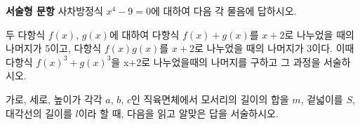 \documentclass[11pt]{exam}
\begin{document}
\begin{questions}
\newpage

\textbf{서술형 문항}
\addpoints
\question[6] 사차방정식 $x^4-9=0$에 대하여 다음 각 물음에 답하시오.
\noaddpoints %

\addpoints
\question[8] 두 다항식 $f(x)$, $g(x)$에 대하여 다항식 $f(x) + g(x)$를 $x+2$로 나누었을 때의 나머지가 5이고, 다항식 $f(x)g(x)$를 $x+2$로 나누었을 때의 나머지가 3이다. 이때 다항식 ${f(x)}^3+{g(x)}^3$을 x+2로 나누었을때의 나머지를 구하고 그 과정을 서술하시오.
\vspace{4.0in}

\addpoints
\question[10] 가로, 세로, 높이가 각각 $a$, $b$, $c$인 직육면체에서 모서리의 길이의 합을 $m$, 겉넓이를 $S$, 대각선의 길이를 $l$이라 할 때, 다음을 읽고 알맞은 답을 서술하시오.
\noaddpoints

\end{questions}
\end{document}
